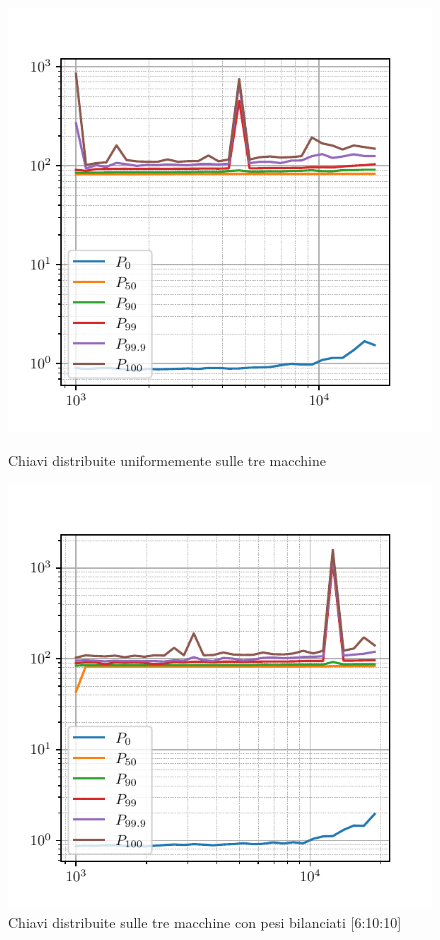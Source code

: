 \begin{figure}[htbp]
    \centering
    \begin{minipage}[t]{0.48\textwidth}
        \centering
        \includegraphics[width=\textwidth]{03-risultati/freq-latency/bench-set-all}
        \caption*{Chiavi distribuite uniformemente sulle tre macchine}
    \end{minipage}
    \hfill
    \begin{minipage}[t]{0.48\textwidth}
        \centering
        \includegraphics[width=\textwidth]{03-risultati/freq-latency/bench-set-all-balance}
        \caption*{Chiavi distribuite sulle tre macchine con pesi bilanciati [6:10:10]}
    \end{minipage}


\end{figure}
